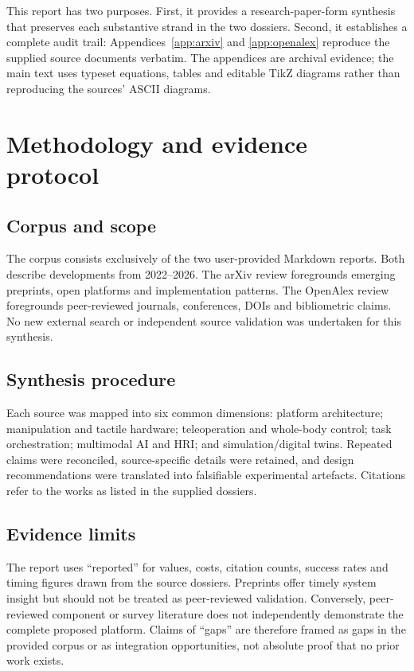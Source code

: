 \documentclass[10pt,a4paper]{article}
\begin{document}
This report has two purposes. First, it provides a research-paper-form synthesis that preserves each substantive strand in the two dossiers. Second, it establishes a complete audit trail: Appendices~\ref{app:arxiv} and \ref{app:openalex} reproduce the supplied source documents verbatim. The appendices are archival evidence; the main text uses typeset equations, tables and editable TikZ diagrams rather than reproducing the sources' ASCII diagrams.

\section{Methodology and evidence protocol}
\subsection{Corpus and scope}
The corpus consists exclusively of the two user-provided Markdown reports. Both describe developments from 2022--2026. The arXiv review foregrounds emerging preprints, open platforms and implementation patterns. The OpenAlex review foregrounds peer-reviewed journals, conferences, DOIs and bibliometric claims. No new external search or independent source validation was undertaken for this synthesis.

\subsection{Synthesis procedure}
Each source was mapped into six common dimensions: platform architecture; manipulation and tactile hardware; teleoperation and whole-body control; task orchestration; multimodal AI and HRI; and simulation/digital twins. Repeated claims were reconciled, source-specific details were retained, and design recommendations were translated into falsifiable experimental artefacts. Citations refer to the works as listed in the supplied dossiers.

\subsection{Evidence limits}
The report uses ``reported'' for values, costs, citation counts, success rates and timing figures drawn from the source dossiers. Preprints offer timely system insight but should not be treated as peer-reviewed validation. Conversely, peer-reviewed component or survey literature does not independently demonstrate the complete proposed platform. Claims of ``gaps'' are therefore framed as gaps in the provided corpus or as integration opportunities, not absolute proof that no prior work exists.
\end{document}
